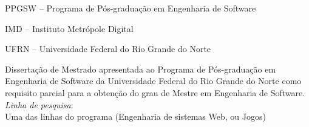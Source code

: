 
\instituicao
{
   PPGSW -- Programa de Pós-graduação em Engenharia de Software\par
   IMD -- Instituto Metrópole Digital\par
   UFRN -- Universidade Federal do Rio Grande do Norte
}
	
\comentario
{
	Dissertação de Mestrado  apresentada ao Programa de Pós-graduação em Engenharia de Software da Universidade Federal do Rio Grande do Norte como requisito parcial para a obtenção do grau de Mestre em Engenharia de Software.\bigskip\\
   \textit{Linha de pesquisa}:\\Uma das linhas do programa (Engenharia de sistemas Web, ou Jogos)
}
		

\folhaderosto